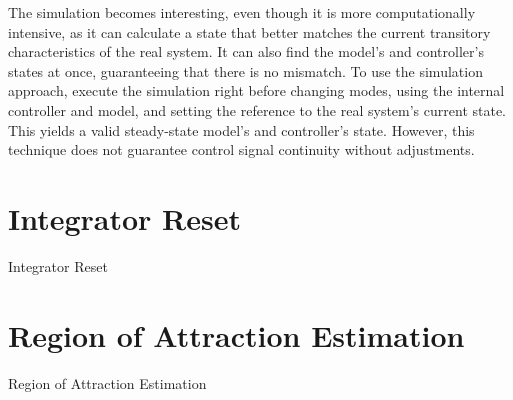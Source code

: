 The simulation becomes interesting, even though it is more computationally
intensive, as it can calculate a state that better matches the current
transitory characteristics of the real system. It can also find the model's and
controller's states at once, guaranteeing that there is no mismatch. To use the
simulation approach, execute the simulation right before changing modes, using
the internal controller and model, and setting the reference to the real
system's current state. This yields a valid steady-state model's and
controller's state. However, this technique does not guarantee control signal
continuity without adjustments.

\section{Integrator Reset}%
\label{sec:integrator-reset}

Integrator Reset

\section{Region of Attraction Estimation}%
\label{sec:roa-estimation}

Region of Attraction Estimation
